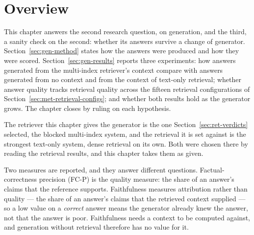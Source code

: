 
\section{Overview}\label{sec:gen-overview}

This chapter answers the second research question, on generation, and the third, a sanity
check on the second: whether its answers survive a change of generator.
Section~\ref{sec:gen-method} states how the answers were produced and how they were
scored. Section~\ref{sec:gen-results} reports three experiments: how answers generated
from the multi-index retriever's context compare with answers generated from no context and
from the context of text-only retrieval; whether answer quality tracks retrieval quality
across the fifteen retrieval configurations of
Section~\ref{sec:met-retrieval-configs}; and whether both results hold as the generator
grows. The chapter closes by ruling on each hypothesis.

The retriever this chapter gives the generator is the one Section~\ref{sec:ret-verdicts}
selected, the blocked multi-index system, and the retrieval it is set against is the
strongest text-only system, dense retrieval on its own. Both were chosen there by reading the
retrieval results, and this chapter takes them as given.

Two measures are reported, and they answer different questions. Factual-correctness precision
(FC-P) is the quality measure: the share of an answer's claims that the reference supports.
Faithfulness measures attribution rather than quality --- the share of an answer's claims that
the retrieved context supplied --- so a low value on a \emph{correct} answer means the
generator already knew the answer, not that the answer is poor. Faithfulness needs a context
to be computed against, and generation without retrieval therefore has no value for it.

